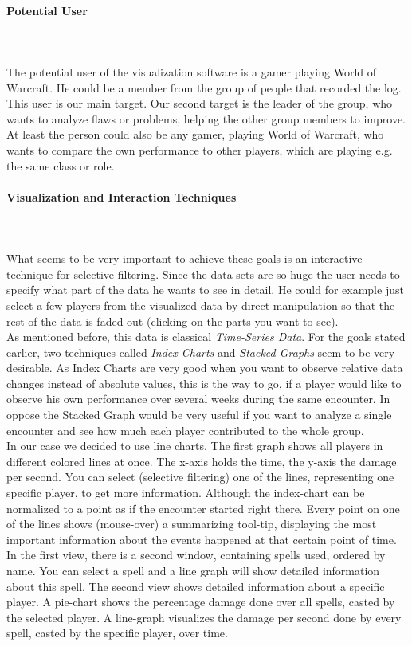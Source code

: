 \documentclass{scrartcl}
\begin{document}
\paragraph{Potential User}
\hfill \\ \hfill \\
The potential user of the visualization software is a gamer playing World of Warcraft. He could be a member from the group of people that recorded the log. This user is our main target. Our second target is the leader of the group, who wants to analyze flaws or problems, helping the other group members to improve. At least the person could also be any gamer, playing World of Warcraft, who wants to compare the own performance to other players, which are playing e.g. the same class or role. 

\paragraph{Visualization and Interaction Techniques}
\hfill \\ \hfill \\
What seems to be very important to achieve these goals is an interactive technique for selective filtering. Since the data sets are so huge the user needs to specify what part of the data he wants to see in detail. He could for example just select a few players from the visualized data by direct manipulation so that the rest of the data is faded out (clicking on the parts you want to see).\\
As mentioned before, this data is classical \emph{Time-Series Data}. For the goals stated earlier, two techniques called \emph{Index Charts} and \emph{Stacked Graphs} seem to be very desirable. As Index Charts are very good when you want to observe relative data changes instead of absolute values, this is the way to go, if a player would like to observe his own performance over several weeks during the same encounter. In oppose the Stacked Graph would be very useful if you want to analyze a single encounter and see how much each player contributed to the whole group.\\
In our case we decided to use line charts. The first graph shows all players in different colored lines at once. The x-axis holds the time, the y-axis the damage per second. You can select (selective filtering) one of the lines, representing one specific player, to get more information. Although the index-chart can be normalized to a point as if the encounter started right there. Every point on one of the lines shows (mouse-over) a summarizing tool-tip, displaying the most important information about the events happened at that certain point of time.\\
In the first view, there is a second window, containing spells used, ordered by name. You can select a spell and a line graph will show detailed information about this spell.
The second view shows detailed information about a specific player. A pie-chart shows the percentage damage done over all spells, casted by the selected player. A line-graph visualizes the damage per second done by every spell, casted by the specific player, over time.
\end{document}
